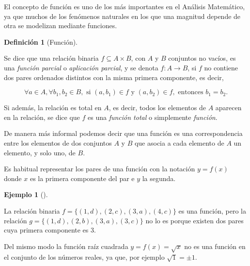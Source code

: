 \documentclass[
  a4paper,
]{scrreport}
\theoremstyle{definition}
\newtheorem{example}{Ejemplo}[chapter]
\theoremstyle{plain}
\theoremstyle{definition}
\newtheorem{definition}{Definición}[chapter]
\theoremstyle{definition}
\theoremstyle{plain}
\theoremstyle{plain}
\theoremstyle{remark}
\begin{document}
El concepto de función es uno de los más importantes en el Análisis
Matemático, ya que muchos de los fenómenos naturales en los que una
magnitud depende de otra se modelizan mediante funciones.

\begin{definition}[Función]\protect\hypertarget{def-funcion}{}\label{def-funcion}

Se dice que una relación binaria \(f \subseteq A \times B\), con \(A\) y
\(B\) conjuntos no vacíos, es una \emph{función parcial} o
\emph{aplicación parcial}, y se denota \(f:A\rightarrow B\), si \(f\) no
contiene dos pares ordenados distintos con la misma primera componente,
es decir,

\[
\forall a \in A, \forall b_1, b_2 \in B, \mbox{ si } (a,b_1) \in f \mbox{ y } (a,b_2) \in f, \mbox{ entonces } b_1 = b_2.
\]

Si además, la relación es total en \(A\), es decir, todos los elementos
de \(A\) aparecen en la relación, se dice que \(f\) es una \emph{función
total} o simplemente \emph{función}.

\end{definition}

De manera más informal podemos decir que una función es una
correspondencia entre los elementos de dos conjuntos \(A\) y \(B\) que
asocia a cada elemento de \(A\) un elemento, y solo uno, de \(B\).

Es habitual representar los pares de una función con la notación
\(y=f(x)\) donde \(x\) es la primera componente del par e \(y\) la
segunda.

\begin{example}[]\protect\hypertarget{exm-funcion}{}\label{exm-funcion}

La relación binaria \(f=\{(1,d), (2,c), (3,a), (4,c)\}\) es una función,
pero la relación \(g=\{(1,d), (2,b), (3,a), (3,c)\}\) no lo es porque
existen dos pares cuya primera componente es \(3\).

Del mismo modo la función raíz cuadrada \(y=f(x)=\sqrt{x}\) no es una
función en el conjunto de los números reales, ya que, por ejemplo
\(\sqrt{1}=\pm 1\).

\end{example}
\end{document}
